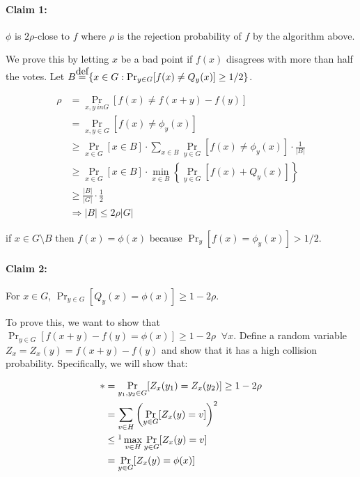 \documentclass{idc_msc}
\newcommand\defeq{\stackrel{\mathclap{\normalfont\mbox{def}}}{=}}
\begin{document}
\paragraph{Claim 1:}

\(\phi\) is \(2\rho\)-close to \(f\) where \(\rho\) is the rejection probability of \(f\) by the algorithm above.

We prove this by letting \(x\) be a bad point if \(f(x)\) disagrees with more than half the votes.
Let \(B \defeq \{x \in G : \Pr_{y \in G} [f (x) \ne Q_y(x)] \ge 1/2\}\).

\[
\begin{aligned}
  \rho &= \Pr_{x, y \ in G}[f(x) \ne f(x+y) - f(y)] \\
  &= \Pr_{x, y \in G} [f(x) \ne \phi_y(x)] \\
  &\ge \Pr_{x \in G} [x \in B] \cdot \sum_{x \in B} \Pr_{y \in G} [ f(x) \ne \phi_y(x)] \cdot \frac{1}{|B|} \\
  &\ge \Pr_{x \in G} [x \in B] \cdot \min_{x \in B} \left\{\Pr_{y \in G} [ f(x) + Q_y(x)] \right\} \\
  &\ge \frac{|B|}{|G|} \cdot \frac{1}{2} \\
  &\Rightarrow |B| \le 2\rho |G|
\end{aligned}
\]

if \(x \in G \setminus B\) then \(f(x) = \phi(x)\) because \(\Pr_{y}[f(x) = \phi_y(x)] > 1/2\).

\paragraph{Claim 2:}

For \(x \in G\), \(\Pr_{y \in G}[Q_y(x) = \phi(x)] \ge 1 - 2\rho\).

To prove this, we want to show that \(\Pr_{y \in G} [ f(x+y) - f(y) = \phi(x)] \ge 1 - 2\rho \;\; \forall x\).
Define a random variable \(Z_x = Z_x(y) = f(x+y) - f(y)\) and show that it has a high collision probability.
Specifically, we will show that:

\[
\begin{aligned}
  * &= \Pr_{y_1, y_2 \in G} [Z_x(y_1) = Z_x(y_2)] \ge 1 - 2\rho \\
  &= \sum_{v \in H} \left(\Pr_{y \in G} [ Z_x(y) = v ]\right)^2 \\
  &\le\footnotemark \max_{v\in H} \Pr_{y \in G} [Z_x(y) = v] \\
  &= \Pr_{y \in G} [Z_x(y) = \phi(x)]
\end{aligned}
\]
\end{document}
